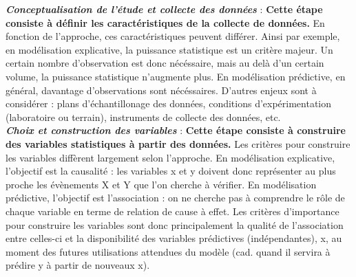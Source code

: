 \documentclass[12pt,twoside]{reedthesis}
\begin{document}
\textbf{\emph{Conceptualisation de l'étude et collecte des données}} : \textbf{Cette étape consiste à définir les caractéristiques de la collecte de données.} En fonction de l'approche, ces caractéristiques peuvent différer. Ainsi par exemple, en modélisation explicative, la puissance statistique est un critère majeur. Un certain nombre d'observation est donc nécéssaire, mais au delà d'un certain volume, la puissance statistique n'augmente plus. En modélisation prédictive, en général, davantage d'observations sont nécéssaires. D'autres enjeux sont à considérer : plans d'échantillonage des données, conditions d'expérimentation (laboratoire ou terrain), instruments de collecte des données, etc.\\

\textbf{\emph{Choix et construction des variables}} : \textbf{Cette étape consiste à construire des variables statistiques à partir des données.} Les critères pour construire les variables diffèrent largement selon l'approche. En modélisation explicative, l'objectif est la causalité : les variables x et y doivent donc représenter au plus proche les évènements X et Y que l'on cherche à vérifier. En modélisation prédictive, l'objectif est l'association : on ne cherche pas à comprendre le rôle de chaque variable en terme de relation de cause à effet. Les critères d'importance pour construire les variables sont donc principalement la qualité de l'association entre celles-ci et la disponibilité des variables prédictives (indépendantes), x, au moment des futures utilisations attendues du modèle (cad. quand il servira à prédire y à partir de nouveaux x).\\
\end{document}
